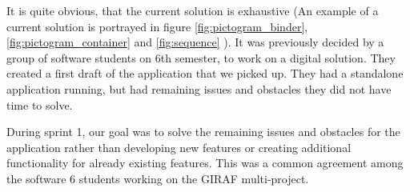 It is quite obvious, that the current solution is exhaustive (An example of a current solution is portrayed in figure \ref{fig:pictogram_binder},\ref{fig:pictogram_container} and \ref{fig:sequence} ). It was previously decided by a group of software students on 6th semester, to work on a digital solution. They created a first draft of the application that we picked up. They had a standalone application running, but had remaining issues and obstacles they did not have time to solve.

During sprint 1, our goal was to solve the remaining issues and obstacles for the application rather than developing new features or creating additional functionality for already existing features. This was a common agreement among the software 6 students working on the GIRAF multi-project.




